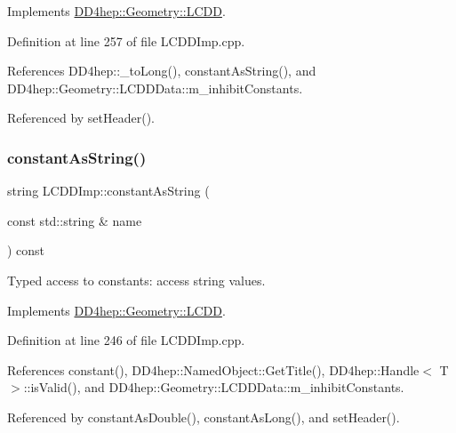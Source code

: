 Implements \hyperlink{class_d_d4hep_1_1_geometry_1_1_l_c_d_d_a95370880f4063064af089b943b0e4ce2}{D\+D4hep\+::\+Geometry\+::\+L\+C\+DD}.



Definition at line 257 of file L\+C\+D\+D\+Imp.\+cpp.



References D\+D4hep\+::\+\_\+to\+Long(), constant\+As\+String(), and D\+D4hep\+::\+Geometry\+::\+L\+C\+D\+D\+Data\+::m\+\_\+inhibit\+Constants.



Referenced by set\+Header().

\hypertarget{class_d_d4hep_1_1_geometry_1_1_l_c_d_d_imp_a57650b5d0dc1d689287959a0d068e5a8}{}\label{class_d_d4hep_1_1_geometry_1_1_l_c_d_d_imp_a57650b5d0dc1d689287959a0d068e5a8} 
\subsubsection{\texorpdfstring{constant\+As\+String()}{constantAsString()}}
{\footnotesize\ttfamily string L\+C\+D\+D\+Imp\+::constant\+As\+String (\begin{DoxyParamCaption}\item[{const std\+::string \&}]{name }\end{DoxyParamCaption}) const\hspace{0.3cm}{\ttfamily [virtual]}}



Typed access to constants\+: access string values. 



Implements \hyperlink{class_d_d4hep_1_1_geometry_1_1_l_c_d_d_a6857611520c86f1d242a1698ab5c181f}{D\+D4hep\+::\+Geometry\+::\+L\+C\+DD}.



Definition at line 246 of file L\+C\+D\+D\+Imp.\+cpp.



References constant(), D\+D4hep\+::\+Named\+Object\+::\+Get\+Title(), D\+D4hep\+::\+Handle$<$ T $>$\+::is\+Valid(), and D\+D4hep\+::\+Geometry\+::\+L\+C\+D\+D\+Data\+::m\+\_\+inhibit\+Constants.



Referenced by constant\+As\+Double(), constant\+As\+Long(), and set\+Header().

